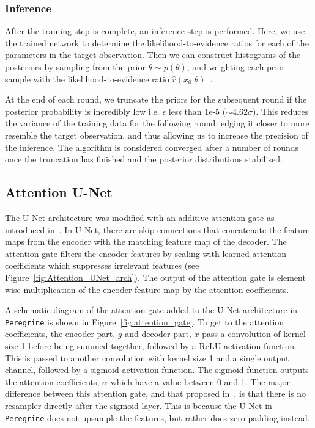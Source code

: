 \subsubsection{Inference}

After the training step is complete, an inference step is performed. Here, we use the trained network to determine the likelihood-to-evidence ratios for each of the parameters in the target observation. 
Then we can construct histograms of the posteriors by sampling from the prior $\theta \sim p(\theta)$, and weighting each prior sample with the likelihood-to-evidence ratio $\hat{r}(x_0|\theta)$~\cite{Miller_TMNRE_2021}.

At the end of each round, we truncate the priors for the subsequent round if the posterior probability is incredibly low i.e. $\epsilon$ less than 1e-5 ($\sim4.62\sigma$). This reduces the variance of the training data for the following round, edging it closer to more resemble the target observation, and thus allowing us to increase the precision of the inference. The algorithm is considered converged after a number of rounds once the truncation has finished and the posterior distributions stabilised.

\subsection{Attention U-Net}

The U-Net architecture was modified with an additive attention gate as introduced in~\cite{Oktay_2018_AUNet}. In U-Net, there are skip connections that concatenate the feature maps from the encoder with the matching feature map of the decoder. The attention gate filters the encoder features by scaling with learned attention coefficients which suppresses irrelevant features (see Figure~\ref{fig:Attention_UNet_arch}). The output of the attention gate is element wise multiplication of the encoder feature map by the attention coefficients.

A schematic diagram of the attention gate added to the U-Net architecture in \texttt{Peregrine} is shown in Figure~\ref{fig:attention_gate}. To get to the attention coefficients,  the encoder part, $g$ and decoder part, $x$ pass a convolution of kernel size 1 
before being summed together, followed by a ReLU activation function. This is passed to another convolution with kernel size 1 and a single output channel, followed by a sigmoid activation function. The sigmoid function outputs the attention coefficients,  $\alpha$ which have a value between 0 and 1. The major difference between this attention gate, and that proposed in~\cite{Oktay_2018_AUNet}, is that there is no resampler directly after the sigmoid layer. This is because the U-Net in \texttt{Peregrine} does not upsample the features, but rather does zero-padding instead.

